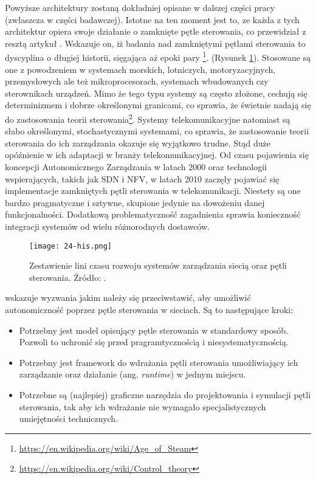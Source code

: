 Powyższe architektury zostaną dokładniej opisane w dalszej części pracy (zwłaszcza w części badawczej). Istotne na ten moment jest to, ze każda z tych architektur opiera swoje działanie o zamknięte pętle sterowania, co przewidział z resztą artykuł \cite{fallon2019}. Wskazuje on, iż badania nad zamkniętymi pętlami sterowania to dyscyplina o długiej historii, sięgająca aż epoki pary \footnote{\url{https://en.wikipedia.org/wiki/Age_of_Steam}}. (Rysunek \ref{fig:24-his}). Stosowane są one z powodzeniem w systemach morskich, lotniczych, motoryzacyjnych, przemysłowych ale też mikroprocesorach, systemach wbudowanych czy sterownikach urządzeń. Mimo że tego typu systemy są często złożone, cechują się determinizmem i dobrze określonymi granicami, co sprawia, że świetnie nadają się do zastosowania teorii sterowania\footnote{\url{https://en.wikipedia.org/wiki/Control_theory}}. Systemy telekomunikacyjne natomiast są słabo określonymi, stochastycznymi systemami, co sprawia, że zastosowanie teorii sterowania do ich zarządzania okazuje się wyjątkowo trudne. Stąd duże opóźnienie w ich adaptacji w branży telekomunikacyjnej. Od czasu pojawienia się koncepcji Autonomicznego Zarządzania \cite{kephart2003} w latach 2000 oraz technologii wspierających, takich jak SDN i NFV, w latach 2010 zaczęły pojawiać się implementacje zamkniętych pętli sterowania w telekomunikacji. Niestety są one bardzo pragmatyczne i sztywne, skupione jedynie na dowożeniu danej funkcjonalności. Dodatkową problematyczność zagadnienia sprawia konieczność integracji systemów od wielu różnorodnych dostawców.

\begin{figure}[!htbp]
    \centering \texttt{[image: 24-his.png]}
    \caption{Zestawienie lini czasu rozwoju systemów zarządzania siecią oraz pętli sterowania. Źródło: \cite{fallon2019}.}\label{fig:24-his}
\end{figure}

\cite{fallon2019} wskazuje wyzwania jakim należy się przeciwstawić, aby umożliwić autonomiczność poprzez pętle sterowania w sieciach. Są to następujące kroki:
\begin{itemize}\hypertarget{list:1}{}
    \item Potrzebny jest model opisujący pętle sterowania w standardowy sposób. Pozwoli to uchronić się przed pragramtycznością i niesystematycznością.
    \item Potrzebny jest framework do wdrażania pętli sterowania umożliwiający ich zarządzanie oraz działanie (ang. \textit{runtime}) w jednym miejscu.
    \item Potrzebne są (najlepiej) graficzne narzędzia do projektowania i symulacji pętli sterowania, tak aby ich wdrażanie nie wymagało specjalistycznych umiejętności technicznych.
\end{itemize}

